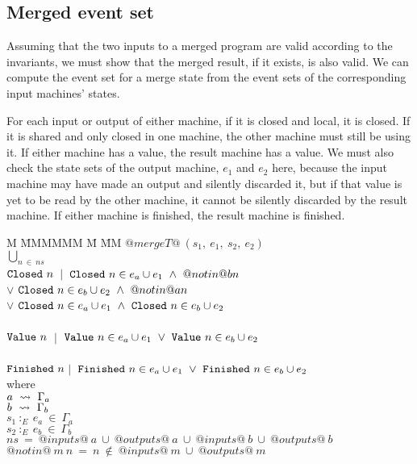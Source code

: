 \subsection{Merged event set}
Assuming that the two inputs to a merged program are valid according to the invariants, we must show that the merged result, if it exists, is also valid.
We can compute the event set for a merge state from the event sets of the corresponding input machines' states.

For each input or output of either machine, if it is closed and local, it is closed.
If it is shared and only closed in one machine, the other machine must still be using it.
If either machine has a value, the result machine has a value.
We must also check the state sets of the output machine, $e_1$ and $e_2$ here, because the input machine may have made an output and silently discarded it, but if that value is yet to be read by the other machine, it cannot be silently discarded by the result machine.
If either machine is finished, the result machine is finished.



\begin{tabbing}
M \= MMMMMM \= M \= MM \kill
$@mergeT@~(s_1,~e_1,~s_2,~e_2)$ \\
$\bigcup_{n~\in~ns}$ \\
 \> $\mathtt{Closed}~n$ \> $~|~$ \> $\mathtt{Closed}~n \in e_a \cup e_1 ~\wedge~ @notin@ b n$ \\
 \>              \> $\vee$\> $\mathtt{Closed}~n \in e_b \cup e_2 ~\wedge~ @notin@ a n$ \\
 \>              \> $\vee$\> $\mathtt{Closed}~n \in e_a \cup e_1 ~\wedge~ \mathtt{Closed}~n \in e_b \cup e_2$ \\
\\
 \> $\mathtt{Value}~n $ \> $~|~$ \> $\mathtt{Value}~n \in e_a \cup e_1  ~\vee~   \mathtt{Value}~n \in e_b \cup e_2$ \\
\\
 \> $\mathtt{Finished}~n$\>$~|~$ \> $\mathtt{Finished}~n \in e_a \cup e_1  ~\vee~   \mathtt{Finished}~n \in e_b \cup e_2$ \\
where \\
 \> $a ~\rightsquigarrow~ \Gamma_a$ \\
 \> $b ~\rightsquigarrow~ \Gamma_b$ \\
 \> $s_1~:_E~e_a~\in~\Gamma_a$ \\
 \> $s_2~:_E~e_b~\in~\Gamma_b$ \\
 \> $ns~=~@inputs@~a~\cup~@outputs@~a~\cup~@inputs@~b~\cup~@outputs@~b$ \\
 \> $@notin@~m~n~=~n~\not\in~@inputs@~m~\cup~@outputs@~m$ \\
\end{tabbing}

